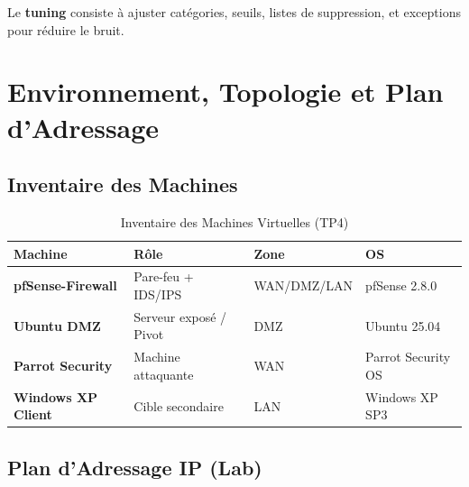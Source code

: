 \documentclass[12pt,a4paper,openany]{report}
\newcommand{\tableheadcolor}{\rowcolor{tableheadbg}}
\begin{document}
	Le \textbf{tuning} consiste à ajuster catégories, seuils, listes de suppression, et exceptions pour réduire le bruit.
	
	\chapter{Environnement, Topologie et Plan d'Adressage}
	
	\section{Inventaire des Machines}
	
	\begin{table}[H]
		\centering
		\renewcommand{\arraystretch}{1.4}
		\setlength{\arrayrulewidth}{0.5pt}
		\begin{tabular}{>{\bfseries}p{3.5cm} p{3.2cm} p{2.8cm} p{3.2cm}}
			\arrayrulecolor{tableborder}
			\hline
			\tableheadcolor
			\textcolor{tableheadfg}{\textbf{Machine}} &
			\textcolor{tableheadfg}{\textbf{Rôle}} &
			\textcolor{tableheadfg}{\textbf{Zone}} &
			\textcolor{tableheadfg}{\textbf{OS}} \\
			\hline
			\rowcolor{tablerowalt}
			pfSense-Firewall & Pare-feu + IDS/IPS & WAN/DMZ/LAN & pfSense 2.8.0 \\
			Ubuntu DMZ & Serveur exposé / Pivot & DMZ & Ubuntu 25.04 \\
			\rowcolor{tablerowalt}
			Parrot Security & Machine attaquante & WAN & Parrot Security OS \\
			Windows XP Client & Cible secondaire & LAN & Windows XP SP3 \\
			\hline
		\end{tabular}
		\caption{Inventaire des Machines Virtuelles (TP4)}
		\label{tab:vm-inventory-tp4}
	\end{table}
	
	\section{Plan d'Adressage IP (Lab)}
	
\end{document}
